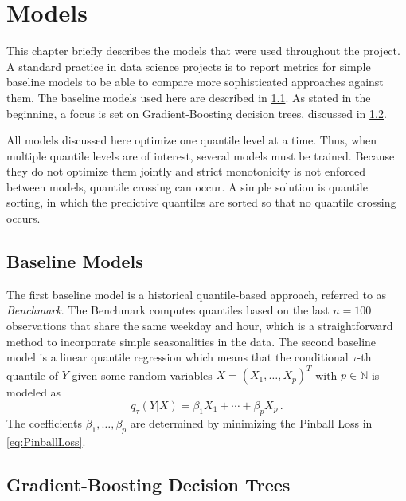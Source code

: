 \newpage
\section{Models}
\label{ch:Models}

This chapter briefly describes the models that were used throughout the project. A standard practice in data science projects is to report metrics for simple baseline models to be able to compare more sophisticated approaches against them. The baseline models used here are described in \cref{sec:Models:Baselines}. As stated in the beginning, a focus is set on Gradient-Boosting decision trees, discussed in \cref{sec:Models:GBDT}.

All models discussed here optimize one quantile level at a time. Thus, when multiple quantile levels are of interest, several models must be trained. Because they do not optimize them jointly and strict monotonicity is not enforced between models, quantile crossing can occur. A simple solution is quantile sorting, in which the predictive quantiles are sorted so that no quantile crossing occurs.

\subsection{Baseline Models}
\label{sec:Models:Baselines}

The first baseline model is a historical quantile-based approach, referred to as \textit{Benchmark}. The Benchmark computes quantiles based on the last $n = 100$ observations that share the same weekday and hour, which is a straightforward method to incorporate simple seasonalities in the data. The second baseline model is a linear quantile regression \parencite{koenker_regression_1978} which means that the conditional $\tau$-th quantile of $Y$ given some random variables $X = (X_1, \ldots, X_p)^T$ with $p \in \mathbb{N}$ is modeled as
\begin{equation}
    q_\tau(Y | X) = \beta_1 X_1 + \cdots + \beta_p X_p \, .
\end{equation}
The coefficients $\beta_1, \ldots, \beta_p$ are determined by minimizing the Pinball Loss in \cref{eq:PinballLoss}.

\subsection{Gradient-Boosting Decision Trees}
\label{sec:Models:GBDT}

